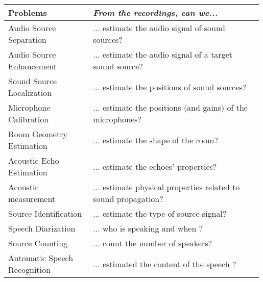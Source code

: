 \begin{tabular}{p{0.33\linewidth} p{0.66\linewidth}}
    \toprule
    Problems & \textit{From the recordings, can we...} \\
    \midrule
    Audio Source Separation   & ... estimate the audio signal of sound sources?\\

    Audio Source Enhancement   & ... estimate the audio signal of a target sound source?\\

    Sound Source Localization & ... estimate the positions of sound sources? \\

    Microphone Calibration    & ... estimate the positions (and gains) of the microphones? \\

    Room Geometry Estimation  & ... estimate the shape of the room? \\

    Acoustic Echo Estimation  & ... estimate the echoes' properties? \\

    Acoustic measurement      & ... estimate physical properties related to sound propagation?\\

    \hline
    Source Identification     & ... estimate the type of source signal?\\

    Speech Diarization        & ... who is speaking and when ? \\

    Source Counting           & ... count the number of speakers? \\

    Automatic Speech Recognition & ... estimated the content of the speech ? \\

    \bottomrule
\end{tabular}